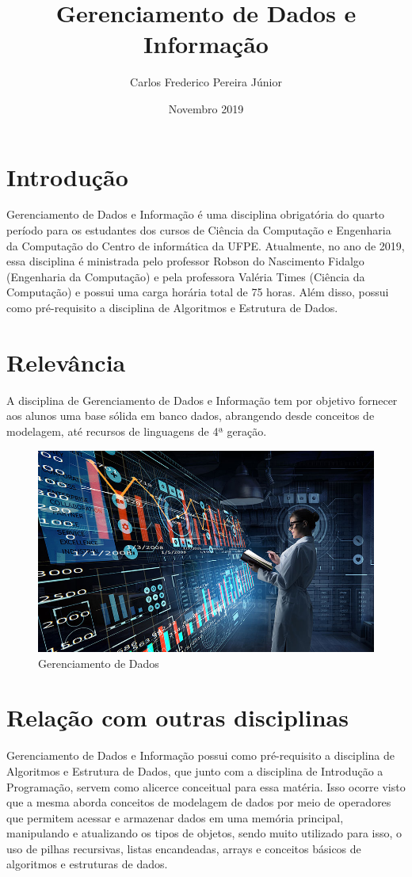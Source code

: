\documentclass{article}
\title{Gerenciamento de Dados e Informação}
\author{Carlos Frederico Pereira Júnior }
\date{Novembro 2019}
\begin{document}
\maketitle

\section{Introdução}
Gerenciamento de Dados e Informação é uma disciplina obrigatória do quarto período para os estudantes dos cursos de Ciência da Computação e Engenharia da Computação do Centro de informática da UFPE. Atualmente, no ano de 2019, essa disciplina é ministrada pelo professor Robson do Nascimento Fidalgo (Engenharia da Computação) e pela professora Valéria Times (Ciência da Computação) e possui uma carga horária total de 75 horas. Além disso, possui como pré-requisito a disciplina de Algoritmos e Estrutura de Dados.\cite{sitedadisciplina}

\section{Relevância}
A disciplina de Gerenciamento de Dados e Informação tem por objetivo fornecer aos alunos uma base sólida em banco dados, abrangendo desde conceitos de modelagem, até recursos de linguagens de 4ª geração.\cite{if685}

\begin{figure}[h!]
\centering
\includegraphics[scale=0.3]{cientista.jpg}
\caption{Gerenciamento de Dados \cite{gerenciamentodedados}}
\label{fig:Gerenciamento de Dados}
\end{figure}

\section{Relação com outras disciplinas}
Gerenciamento de Dados e Informação possui como pré-requisito a disciplina de Algoritmos e Estrutura de Dados, que junto com a disciplina de Introdução a Programação, servem como alicerce conceitual para essa matéria. Isso ocorre visto que a mesma aborda conceitos de modelagem de dados por meio de operadores que permitem acessar e armazenar dados em uma memória principal, manipulando e atualizando os tipos de objetos, sendo muito utilizado para isso, o uso de pilhas recursivas, listas encandeadas, arrays e conceitos básicos de algoritmos e estruturas de dados.







\end{document}

